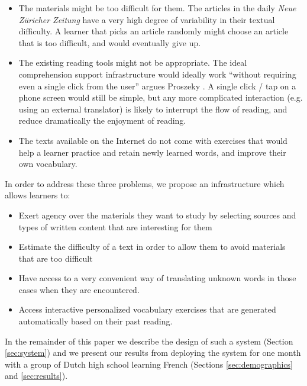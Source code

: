 \begin{itemize}
	
  \item The materials might be too difficult for them. The articles in the  daily {\em Neue Z\"uricher Zeitung} have a very high degree of variability in their textual difficulty. A learner that picks an article randomly might choose an article that is too difficult, and would eventually give up. 

  \item The existing reading tools might not be appropriate. The ideal comprehension support infrastructure would ideally work ``without requiring even a single click from the user'' argues Proszeky \cite{Proszeky02-Comprehension}. A single click / tap on a phone screen would still be simple, but any more complicated interaction (e.g. using an external translator) is likely to interrupt the flow of reading, and reduce dramatically the enjoyment of reading. 
  
  \item The texts available on the Internet do not come with exercises that would help a learner practice and retain newly learned words, and improve their own vocabulary. 
  
\end{itemize}

In order to address these three problems, we propose an infrastructure which allows learners to: 

	\begin{itemize}
	
		\item Exert agency over the materials they want to study by selecting sources and types of written content that are interesting for them
	
		\item Estimate the difficulty of a text in order to allow them to avoid materials that are too difficult
	
		\item Have access to a very convenient way of translating unknown words in those cases when they are encountered.

		\item Access interactive personalized vocabulary exercises that are generated automatically based on their past reading.

	\end{itemize}

In the remainder of this paper we describe the design of such a system (Section \ref{sec:system}) and we present our results from deploying the system for one month with a group of Dutch high school \students learning French (Sections \ref{sec:demographics} and \ref{sec:results}). 

